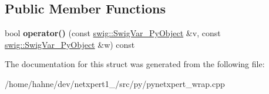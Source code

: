 \subsection*{Public Member Functions}
\begin{DoxyCompactItemize}
\item 
bool {\bfseries operator()} (const \hyperlink{structswig_1_1SwigVar__PyObject}{swig\+::\+Swig\+Var\+\_\+\+Py\+Object} \&v, const \hyperlink{structswig_1_1SwigVar__PyObject}{swig\+::\+Swig\+Var\+\_\+\+Py\+Object} \&w) const \hypertarget{structstd_1_1less_3_01swig_1_1SwigVar__PyObject_01_4_a7cfb709f8a11671ebbf9839e953b3a97}{}\label{structstd_1_1less_3_01swig_1_1SwigVar__PyObject_01_4_a7cfb709f8a11671ebbf9839e953b3a97}

\end{DoxyCompactItemize}


The documentation for this struct was generated from the following file\+:\begin{DoxyCompactItemize}
\item 
/home/hahne/dev/netxpert1\+\_/src/py/pynetxpert\+\_\+wrap.\+cpp\end{DoxyCompactItemize}
